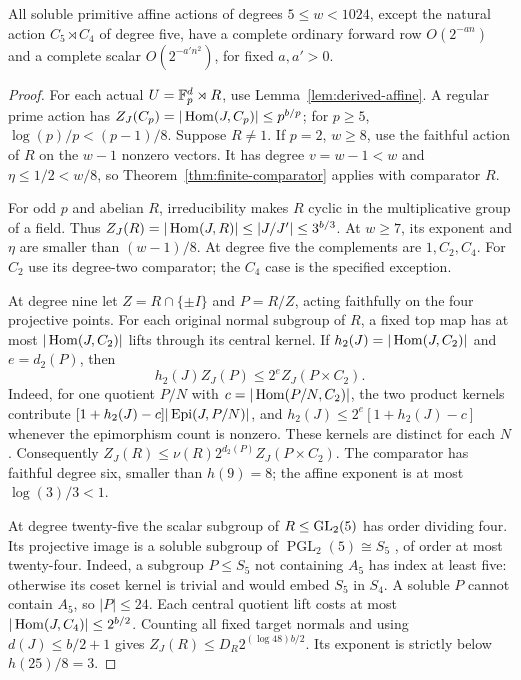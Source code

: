 \begin{theorem}
\label{thm:soluble-primitive-consumer}
All soluble primitive affine actions of degrees $5\leq w<1024$,
except the natural action $C_5\rtimes C_4$ of degree five,
have a complete ordinary forward row $O(2^{-an})$ and a
complete scalar $O(2^{-a'n^2})$, for fixed $a,a'>0$.
\end{theorem}
\begin{proof}
For each actual $U=\mathbb F_p^d\rtimes R$, use
Lemma~\ref{lem:derived-affine}. A regular prime action has
$Z_J(C_p)=|\operatorname{Hom}(J,C_p)|\leq p^{b/p}$; for $p\geq5$,
$\log(p)/p<(p-1)/8$. Suppose $R\ne1$.
If $p=2$, $w\geq8$, use the faithful action of $R$ on the
$w-1$ nonzero vectors. It has degree $v=w-1<w$ and
$\eta\leq1/2<w/8$, so Theorem~\ref{thm:finite-comparator}
applies with comparator $R$.

For odd $p$ and abelian $R$, irreducibility makes $R$ cyclic
in the multiplicative group of a field. Thus
$Z_J(R)=|\operatorname{Hom}(J,R)|\leq|J/J'|\leq3^{b/3}$.
At $w\geq7$, its exponent and $\eta$ are smaller than
$(w-1)/8$. At degree five the complements are $1,C_2,C_4$.
For $C_2$ use its degree-two comparator; the $C_4$ case is
the specified exception.

At degree nine let $Z=R\cap\{\pm I\}$ and $P=R/Z$,
acting faithfully on the four projective points. For each
original normal subgroup of $R$, a fixed top map has at
most $|\operatorname{Hom}(J,C_2)|$ lifts through its central kernel.
If $h_2(J)=|\operatorname{Hom}(J,C_2)|$ and $e=d_2(P)$, then
\[
 h_2(J)Z_J(P)\leq2^eZ_J(P\times C_2).
\]
Indeed, for one quotient $P/N$ with $c=|\operatorname{Hom}(P/N,C_2)|$,
the two product kernels contribute
$[1+h_2(J)-c]|\operatorname{Epi}(J,P/N)|$, and
$h_2(J)\leq2^e[1+h_2(J)-c]$ whenever the epimorphism
count is nonzero. These kernels are distinct for each $N$.
Consequently
$Z_J(R)\leq\nu(R)2^{d_2(P)}Z_J(P\times C_2)$.
The comparator has faithful degree six, smaller than $h(9)=8$;
the affine exponent is at most $\log(3)/3<1$.

At degree twenty-five the scalar subgroup of $R\leq\operatorname{GL}_2(5)$
has order dividing four. Its projective image is a soluble
subgroup of $\operatorname{PGL}_2(5)\cong S_5$ \cite[Lemma~13]{Adler1992Modular}, of order at
most twenty-four. Indeed, a subgroup $P\leq S_5$ not containing
$A_5$ has index at least five: otherwise its coset kernel is trivial
and would embed $S_5$ in $S_4$. A soluble $P$ cannot contain $A_5$,
so $|P|\leq24$.
Each central quotient lift costs at most
$|\operatorname{Hom}(J,C_4)|\leq2^{b/2}$. Counting all fixed target normals
and using $d(J)\leq b/2+1$ gives
$Z_J(R)\leq D_R2^{(\log48)b/2}$.
Its exponent is strictly below $h(25)/8=3$.


\end{proof}
